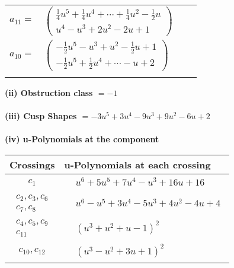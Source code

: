 \documentclass[1p]{elsarticle_modified}
\theoremstyle{definition}
\begin{document}
\begin{tabular}{m{7pt} m{180pt} m{7pt} m{180pt} }
\flushright $a_{11}=$&$\begin{pmatrix}\frac{1}{4} u^5+\frac{1}{4} u^4+\cdots+\frac{1}{4} u^2-\frac{1}{2} u\\u^4- u^3+2 u^2-2 u+1\end{pmatrix}$ \\
\flushright $a_{10}=$&$\begin{pmatrix}-\frac{1}{2} u^5- u^3+u^2-\frac{1}{2} u+1\\-\frac{1}{2} u^5+\frac{1}{2} u^4+\cdots- u+2\end{pmatrix}$\\&\end{tabular}
\flushleft \textbf{(ii) Obstruction class $= -1$}\\~\\
\flushleft \textbf{(iii) Cusp Shapes $= -3 u^5+3 u^4-9 u^3+9 u^2-6 u+2$}\\~\\
\newpage\renewcommand{\arraystretch}{1}
\flushleft \textbf{(iv) u-Polynomials at the component}\newline \\
\begin{tabular}{m{50pt}|m{274pt}}
Crossings & \hspace{64pt}u-Polynomials at each crossing \\
\hline $$\begin{aligned}c_{1}\end{aligned}$$&$\begin{aligned}
&u^6+5 u^5+7 u^4- u^3+16 u+16
\end{aligned}$\\
\hline $$\begin{aligned}c_{2},c_{3},c_{6}\\c_{7},c_{8}\end{aligned}$$&$\begin{aligned}
&u^6- u^5+3 u^4-5 u^3+4 u^2-4 u+4
\end{aligned}$\\
\hline $$\begin{aligned}c_{4},c_{5},c_{9}\\c_{11}\end{aligned}$$&$\begin{aligned}
&(u^3+u^2+u-1)^2
\end{aligned}$\\
\hline $$\begin{aligned}c_{10},c_{12}\end{aligned}$$&$\begin{aligned}
&(u^3- u^2+3 u+1)^2
\end{aligned}$\\
\hline
\end{tabular}\\~\\
\end{document}

